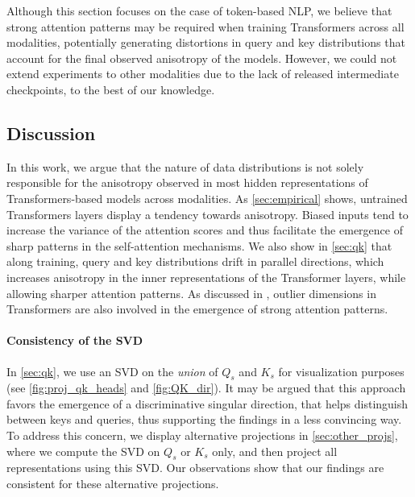 Although this section focuses on the case of token-based NLP, we believe that strong attention patterns may be required when training Transformers across all modalities, potentially generating distortions in query and key distributions that account for the final observed anisotropy of the models. However, we could not extend experiments to other modalities due to the lack of released intermediate checkpoints, to the best of our knowledge.

\subsection{Discussion}
\label{sec:discussion}

In this work, we argue that the nature of data distributions is not solely responsible for the anisotropy observed in most hidden representations of Transformers-based models across modalities. As \autoref{sec:empirical} shows, untrained Transformers layers display a tendency towards anisotropy. Biased inputs tend to increase the variance of the attention scores and thus facilitate the emergence of sharp patterns in the self-attention mechanisms. We also show in \autoref{sec:qk} that along training, query and key distributions drift in parallel directions, which increases anisotropy in the inner representations of the Transformer layers, while allowing sharper attention patterns. As discussed in \citet{puccetti-etal-2022-outlier}, outlier dimensions in Transformers are also involved in the emergence of strong attention patterns.

\paragraph{Consistency of the SVD} In \autoref{sec:qk}, we use an SVD on the \textit{union} of $Q_s$ and $K_s$ for visualization purposes (see \autoref{fig:proj_qk_heads} and \autoref{fig:QK_dir}). It may be argued that this approach favors the emergence of a discriminative singular direction, that helps distinguish between keys and queries, thus supporting the findings in a less convincing way. To address this concern, we display alternative projections in \autoref{sec:other_projs}, where we compute the SVD on $Q_s$ or $K_s$ only, and then project all representations using this SVD. Our observations show that our findings are consistent for these alternative projections.

